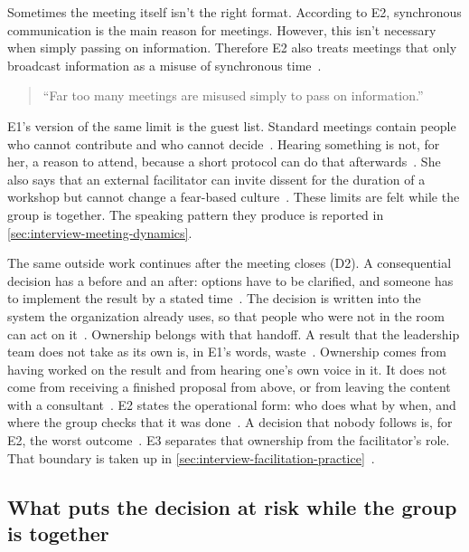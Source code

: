 Sometimes the meeting itself isn't the right format. According to E2, synchronous communication is the main
reason for meetings. However, this isn't necessary when simply passing on information.
Therefore E2 also treats meetings that only broadcast information as a misuse of synchronous
time~.
{\setlength{\topsep}{0.25\baselineskip}\setlength{\partopsep}{0pt}%
  \begin{quote}\small
    \enquote{Far too many meetings are misused simply to pass on information.}~
\end{quote}}
E1's version of the same limit is the guest list.
Standard meetings contain people who cannot contribute and who cannot
decide~.
Hearing something is not, for her, a reason to attend, because a short protocol can do that
afterwards~.
She also says that an external facilitator can invite dissent for the duration of a workshop
but cannot change a fear-based culture~.
These limits are felt while the group is together.
The speaking pattern they produce is reported in \autoref{sec:interview-meeting-dynamics}.

The same outside work continues after the meeting closes (D2).
A consequential decision has a before and an after: options have to be clarified, and someone
has to implement the result by a stated time~.
The decision is written into the system the organization already uses, so that people who
were not in the room can act on it~.
Ownership belongs with that handoff.
A result that the leadership team does not take as its own is, in E1's words,
waste~.
Ownership comes from having worked on the result and from hearing one's own voice in it.
It does not come from receiving a finished proposal from above, or from leaving the content
with a consultant~.
E2 states the operational form: who does what by when, and where the group checks that it
was done~.
A decision that nobody follows is, for E2, the worst outcome~.
E3 separates that ownership from the facilitator's role.
That boundary is taken up in \autoref{sec:interview-facilitation-practice}~.

\subsection{What puts the decision at risk while the group is together}
\label{sec:interview-meeting-dynamics}

